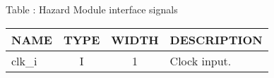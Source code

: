 {
  \vspace{0.5em}
  \begin{center}
    Table \thetable: Hazard Module interface signals\label{tab:hzdm-interface}
  \end{center}

\footnotesize
\begin{xltabular}{0.9\textwidth}{|l|c|c|X|}
  \hline
  \textbf{NAME} & \textbf{TYPE} & \textbf{WIDTH} & \textbf{DESCRIPTION} \\
  \hline
  clk\_i & I & 1 & Clock input. \\
  \hline
\end{xltabular}
}
